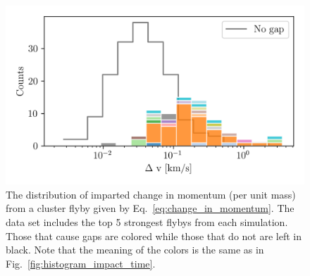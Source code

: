 \documentclass[draft]{aa}
\begin{document}
    \begin{figure}
      \centering
      \includegraphics[width=1\linewidth]{impact_geometry_statistics_deltaP.png}
      \caption{The distribution of imparted  change in momentum (per unit mass) from a cluster flyby given by Eq.~\ref{eq:change_in_momentum}. The data set includes the top 5 strongest flybys from each simulation. Those that cause gaps are colored while those that do not are left in black. Note that the meaning of the colors is the same as in Fig.~\ref{fig:histogram_impact_time}.}
      \label{fig:deltap}
    \end{figure}
      
\end{document}
